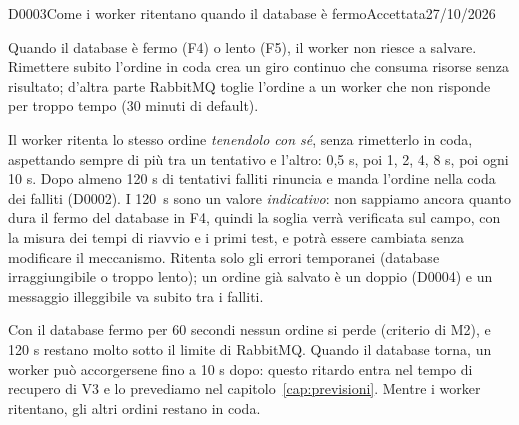 \begin{decisione}{D0003}{Come i worker ritentano quando il database è fermo}{Accettata}{27/10/2026}

\contesto
Quando il database è fermo (F4) o lento (F5), il worker non riesce a salvare. Rimettere subito l'ordine in coda crea un giro continuo che consuma risorse senza risultato; d'altra parte RabbitMQ toglie l'ordine a un worker che non risponde per troppo tempo (30 minuti di default).

\scelta
Il worker ritenta lo stesso ordine \emph{tenendolo con sé}, senza rimetterlo in coda, aspettando sempre di più tra un tentativo e l'altro: 0,5 s, poi 1, 2, 4, 8 s, poi ogni 10 s. Dopo almeno 120 s di tentativi falliti rinuncia e manda l'ordine nella coda dei falliti (D0002). I 120~s sono un valore \emph{indicativo}: non sappiamo ancora quanto dura il fermo del database in F4, quindi la soglia verrà verificata sul campo, con la misura dei tempi di riavvio e i primi test, e potrà essere cambiata senza modificare il meccanismo. Ritenta solo gli errori temporanei (database irraggiungibile o troppo lento); un ordine già salvato è un doppio (D0004) e un messaggio illeggibile va subito tra i falliti.

\conseguenze
Con il database fermo per 60 secondi nessun ordine si perde (criterio di M2), e 120 s restano molto sotto il limite di RabbitMQ. Quando il database torna, un worker può accorgersene fino a 10 s dopo: questo ritardo entra nel tempo di recupero di V3 e lo prevediamo nel capitolo~\ref{cap:previsioni}. Mentre i worker ritentano, gli altri ordini restano in coda.

\end{decisione}

